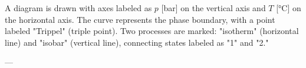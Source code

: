 A diagram is drawn with axes labeled as \( p \) [bar] on the vertical axis and \( T \) [°C] on the horizontal axis. The curve represents the phase boundary, with a point labeled "Trippel" (triple point). Two processes are marked: "isotherm" (horizontal line) and "isobar" (vertical line), connecting states labeled as "1" and "2."

---